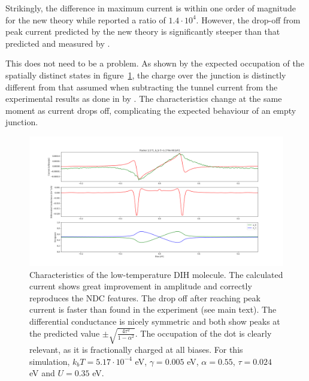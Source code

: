 \documentclass{article}
\begin{document}
\begin{multicols}{2}
        Strikingly, the difference in maximum current is within one order of magnitude for the new theory while \citet{perrinnano} reported a ratio of $1.4\cdot10^{4}$. However, the drop-off from peak current predicted by the new theory is significantly steeper than that predicted and measured by \citet{perrinnano}.
         
        This does not need to be a problem. As shown by the expected occupation of the spatially distinct states in figure~\ref{fig:perrinmolecule}, the charge over the junction is distinctly different from that assumed when subtracting the tunnel current from the experimental results as done in by \cite{perrinnano}. The characteristics change at the same moment as current drops off, complicating the expected behaviour of an empty junction. 
        
    \begin{figure}[b]
        \centering
        \includegraphics[width=\textwidth]{figure_gam0050alpha55tau024capacitive35points200.png}
        \caption{\label{fig:perrinmolecule} Characteristics of the low-temperature DIH molecule. The calculated current shows great improvement in amplitude and correctly reproduces the NDC features. The drop off after reaching peak current  is faster than found in the experiment (see main text). The differential conductance is nicely symmetric and both show peaks at the predicted value $\pm\sqrt{\frac{4\tau^2}{1-\alpha^2}}$. The occupation of the dot is clearly relevant, as it is fractionally charged at all biases. For this simulation, $k_b T=5.17\cdot 10^{-4}$ eV, $\gamma=0.005$ eV, $\alpha=0.55$, $\tau=0.024$ eV and $U=0.35$ eV.}
    \end{figure}
    

\end{multicols}
\end{document}
